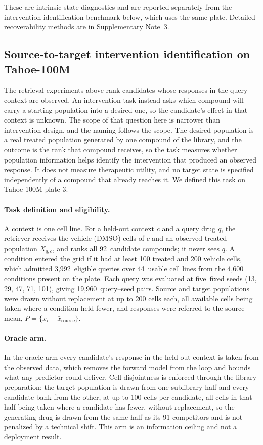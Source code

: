 \documentclass[11pt,letterpaper]{article}
\newcommand{\NCAND}{92}                 %
\newcommand{\NQUERIES}{3,992}           %
\newcommand{\NCTX}{44}                  %
\newcommand{\NSEEDS}{five}              %
\newcommand{\NQSEED}{19,960}
\begin{document}
These are intrinsic-state diagnostics and are reported separately from the intervention-identification
benchmark below, which uses the same plate. Detailed recoverability methods are in Supplementary
Note~3.


\subsection*{Source-to-target intervention identification on Tahoe-100M}

The retrieval experiments above rank candidates whose responses in the query context are observed.
An intervention task instead asks which compound will carry a starting population into a desired
one, so the candidate's effect in that context is unknown. The scope of that question here is
narrower than intervention design, and the naming follows the scope. The desired population is a
real treated population generated by one compound of the library, and the outcome is the rank that
compound receives, so the task measures whether population information helps identify the
intervention that produced an observed response. It does not measure therapeutic utility, and no
target state is specified independently of a compound that already reaches it. We defined this task on Tahoe-100M plate
3.

\paragraph{Task definition and eligibility.}
A context is one cell line. For a held-out context $c$ and a query drug $q$, the retriever receives
the vehicle (DMSO) cells of $c$ and an observed treated population $X_{q,c}$, and ranks all
\NCAND\ candidate compounds; it never sees $q$. A condition entered the grid if it had at least 100
treated and 200 vehicle cells, which admitted \NQUERIES\ eligible queries over \NCTX\ usable cell
lines from the 4,600 conditions present on the plate. Each query was evaluated at \NSEEDS\ fixed
seeds (13, 29, 47, 71, 101), giving \NQSEED\ query--seed pairs. Source and target populations were
drawn without replacement at up to 200 cells each, all available cells being taken where a
condition held fewer, and responses were referred to the source mean,
$P=\{x_i-\bar{x}_{\mathrm{source}}\}$.

\paragraph{Oracle arm.}
In the oracle arm every candidate's response in the held-out context is taken from the observed
data, which removes the forward model from the loop and bounds what any predictor could deliver.
Cell disjointness is enforced through the library preparation: the target population is drawn from
one sublibrary half and every candidate bank from the other, at up to 100 cells per candidate,
all cells in that half being taken where a candidate has fewer, without
replacement, so the generating drug is drawn from the same half as its 91 competitors and is not
penalized by a technical shift. This arm is an information ceiling and not a deployment result.
\end{document}

